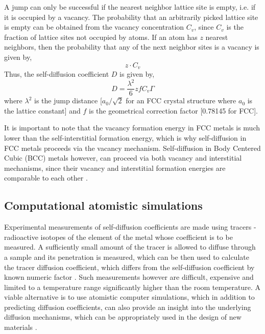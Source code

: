 \documentclass{article}
\begin{document}
A jump can only be successful if the nearest neighbor lattice site is empty, i.e. if it is occupied by a vacancy. The probability that an arbitrarily picked lattice site is empty can be obtained from the vacancy concentration $C_v$, since $C_v$ is the fraction of lattice sites not occupied by atoms. If an atom has $z$ nearest neighbors, then the probability that any of the next neighbor sites is a vacancy is given by, 
%
\begin{equation}
z \cdot C_v
\end{equation}
%
 Thus, the self-diffusion coefficient $D$ is given by,
%
\begin{equation}
D = \dfrac{\lambda^2}{6} z f C_v \Gamma
\end{equation}
%
where $\lambda^2$ is the jump distance [$a_0/\sqrt 2$ for an FCC crystal structure where $a_0$ is the lattice constant] and $f$ is the geometrical correction factor [0.78145 for FCC].

It is important to note that the vacancy formation energy in FCC metals is much lower than the self-interstitial formation energy, which is why self-diffusion in FCC metals proceeds via the vacancy mechanism. Self-diffusion in Body Centered Cubic (BCC) metals however, can proceed via both vacancy and interstitial mechanisms, since their vacancy and interstitial formation energies are comparable to each other \cite{Mendelev2007}. 

\subsection{Computational atomistic simulations}

Experimental measurements of self-diffusion coefficients are made using tracers - radioactive isotopes of the element of the metal whose coefficient is to be measured. A sufficiently small amount of the tracer is allowed to diffuse through a sample and its penetration is measured, which can be then used to calculate the tracer diffusion coefficient, which differs from the self-diffusion coefficient by known numeric factor \cite{Mehrer2007} . Such measurements however are difficult, expensive and limited to a  temperature range significantly higher than the room temperature. A viable alternative is to use atomistic computer simulations, which in addition to predicting diffusion coefficients, can also provide an insight into the underlying diffusion mechanisms, which can be appropriately used in the design of new materials \cite{Mishin2005}.
\end{document}
